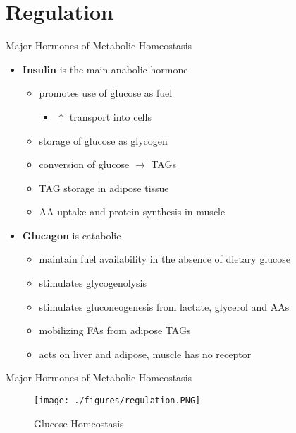 \documentclass[presentation, smaller]{beamer}
\begin{document}
\section{Regulation}
\label{sec:org15d113e}
\begin{frame}[label={sec:org2d9742c}]{Major Hormones of Metabolic Homeostasis}
\begin{itemize}
\item \textbf{Insulin} is the main anabolic hormone
\begin{itemize}
\item promotes use of glucose as fuel
\begin{itemize}
\item \(\uparrow\) transport into cells
\end{itemize}
\item storage of glucose as glycogen
\item conversion of glucose \(\to\) TAGs
\item TAG storage in adipose tissue
\item AA uptake and protein synthesis in muscle
\end{itemize}
\item \textbf{Glucagon} is catabolic
\begin{itemize}
\item maintain fuel availability in the absence of dietary glucose
\item stimulates glycogenolysis
\item stimulates gluconeogenesis from lactate, glycerol and AAs
\item mobilizing FAs from adipose TAGs
\item acts on liver and adipose, muscle has no receptor
\end{itemize}
\end{itemize}
\end{frame}

\begin{frame}[label={sec:org4357624}]{Major Hormones of Metabolic Homeostasis}
\begin{figure}[htbp]
\centering
\texttt{[image: ./figures/regulation.PNG]}
\caption{\label{fig:orgc23fb59}
Glucose Homeostasis}
\end{figure}
\end{frame}
\end{document}
